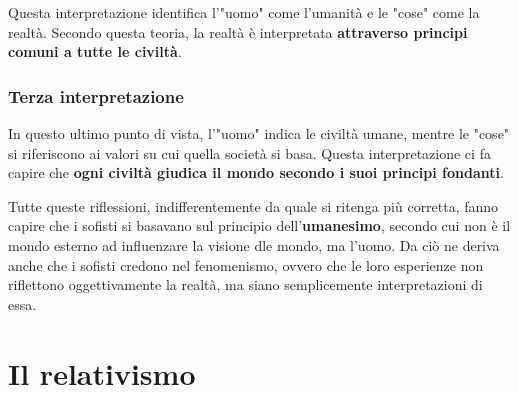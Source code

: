 \documentclass[10pt,a4paper]{article}
\begin{document}
	Questa interpretazione identifica l'"uomo" come l'umanità e le "cose" come la realtà. Secondo questa teoria, la realtà è interpretata \textbf{attraverso principi comuni a tutte le civiltà}.
	
	\subsubsection{Terza interpretazione}
	
	In questo ultimo punto di vista, l'"uomo" indica le civiltà umane, mentre le "cose" si riferiscono ai valori su cui quella società si basa. Questa interpretazione ci fa capire che \textbf{ogni civiltà giudica il mondo secondo i suoi principi fondanti}.
	
	Tutte queste riflessioni, indifferentemente da quale si ritenga più corretta, fanno capire che i sofisti si basavano sul principio dell'\textbf{umanesimo}, secondo cui non è il mondo esterno ad influenzare la visione dle mondo, ma l'uomo. Da ciò ne deriva anche che i sofisti credono nel fenomenismo, ovvero che le loro esperienze non riflettono oggettivamente la realtà, ma siano semplicemente interpretazioni di essa.
	
	\section{Il relativismo}
		   
	
\end{document}
